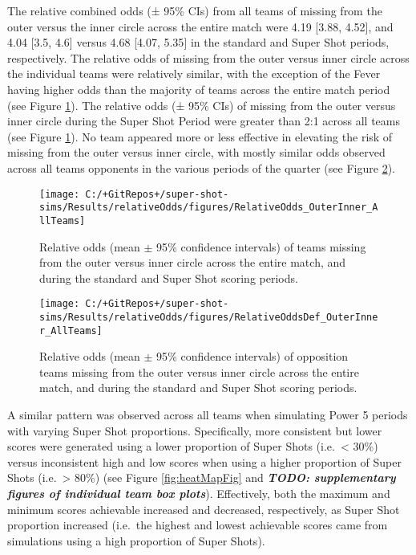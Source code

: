 \documentclass[]{elsarticle} %
\begin{document}
The relative combined odds (± 95\% CIs) from all teams of missing from
the outer versus the inner circle across the entire match were 4.19
{[}3.88, 4.52{]}, and 4.04 {[}3.5, 4.6{]} versus 4.68 {[}4.07, 5.35{]}
in the standard and Super Shot periods, respectively. The relative odds
of missing from the outer versus inner circle across the individual
teams were relatively similar, with the exception of the Fever having
higher odds than the majority of teams across the entire match period
(see Figure \ref{fig:relativeOddsFig}). The relative odds (± 95\% CIs)
of missing from the outer versus inner circle during the Super Shot
Period were greater than 2:1 across all teams (see Figure
\ref{fig:relativeOddsFig}). No team appeared more or less effective in
elevating the risk of missing from the outer versus inner circle, with
mostly similar odds observed across all teams opponents in the various
periods of the quarter (see Figure \ref{fig:relativeOddsDefFig}).

\begin{figure}

{\centering \texttt{[image: C:/+GitRepos+/super-shot-sims/Results/relativeOdds/figures/RelativeOdds\_OuterInner\_AllTeams]} 

}

\caption{Relative odds (mean $\pm$ 95$\%$ confidence intervals) of teams missing from the outer versus inner circle across the entire match, and during the standard and Super Shot scoring periods.}\label{fig:relativeOddsFig}
\end{figure}

\begin{figure}

{\centering \texttt{[image: C:/+GitRepos+/super-shot-sims/Results/relativeOdds/figures/RelativeOddsDef\_OuterInner\_AllTeams]} 

}

\caption{Relative odds (mean $\pm$ 95$\%$ confidence intervals) of opposition teams missing from the outer versus inner circle across the entire match, and during the standard and Super Shot scoring periods.}\label{fig:relativeOddsDefFig}
\end{figure}

A similar pattern was observed across all teams when simulating Power 5
periods with varying Super Shot proportions. Specifically, more
consistent but lower scores were generated using a lower proportion of
Super Shots (i.e.~\textless{} 30\%) versus inconsistent high and low
scores when using a higher proportion of Super Shots
(i.e.~\textgreater{} 80\%) (see Figure \ref{fig:heatMapFig} and
\textbf{\emph{TODO: supplementary figures of individual team box
plots}}). Effectively, both the maximum and minimum scores achievable
increased and decreased, respectively, as Super Shot proportion
increased (i.e.~the highest and lowest achievable scores came from
simulations using a high proportion of Super Shots).
\end{document}
